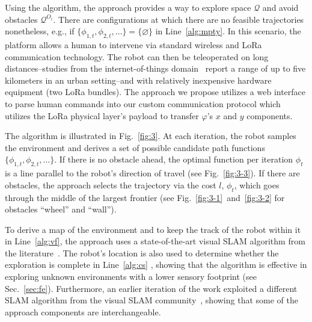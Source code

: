 \documentclass[lettersize,journal]{IEEEtran}
\theoremstyle{definition}
\begin{document}
Using the algorithm, the %
approach provides a way to explore space $\mathcal{Q}$ and avoid obstacles $\mathcal{Q}^{O_i}$. There are configurations at which there are no feasible trajectories nonetheless, e.g., if $\{\phi_{1,t},\phi_{2,t},\dots\}=\{\varnothing\}$ in Line~\ref{alg:mpty}. In this scenario, the %
platform allows a human to intervene via standard wireless and LoRa communication technology. The robot can then be teleoperated on long distances--studies from the internet-of-things domain~\cite{shanmuga2020survey,raza2017lora} report a range of up to five kilometers in an urban setting--and with relatively inexpensive hardware equipment (two LoRa bundles). The %
approach we propose utilizes a web interface to parse human commands into our custom communication protocol which utilizes the LoRa physical layer's payload to transfer $\varphi$'s $x$ and $y$ components.

The algorithm is illustrated in Fig.~\ref{fig:3}. At each iteration, the robot samples the environment and derives a set of possible candidate path functions $\{\phi_{1,t},\phi_{2,t},\dots\}$. If there is no obstacle ahead, the optimal function per iteration $\phi_t$ is a line parallel to the robot's direction of travel (see Fig.~\ref{fig:3-3}). If there are obstacles, the %
approach selects the trajectory via the cost $l$, $\phi_t$, which goes through the middle of the largest frontier (see Fig.~\ref{fig:3-1}~and~\ref{fig:3-2} for %
obstacles ``wheel'' and ``wall'').

To derive a map of the environment and to keep the track of the robot within it in Line~\ref{alg:vf}, the %
approach uses a state-of-the-art visual SLAM algorithm from the literature~\cite{labbe2019rtab}. The robot's location is also used to determine whether the exploration is complete in Line~\ref{alg:cs}%
, showing that the algorithm is effective in exploring unknown environments with a lower sensory footprint (see Sec.~\ref{sec:fe}). Furthermore, an earlier iteration of the work exploited a different SLAM algorithm from the visual SLAM community~\cite{campos2021orb}, showing that some of the %
approach components are interchangeable.
\end{document}
